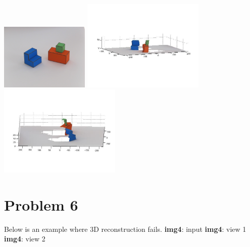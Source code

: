 \documentclass[12pt,twoside]{article}
\newcommand{\tabUnit}{3ex}
\newcommand{\tabT}{\hspace*{\tabUnit}}
\begin{document}
\includegraphics[width = 120pt]{img2}
\includegraphics[width = 165pt]{img2_cv1}
\includegraphics[width = 165pt]{img2_cv2}

\section*{Problem 6}
Below is an example where 3D reconstruction fails.
\newline
\newline
\tabT\tabT\tabT \textbf{img4}: input
\tabT\tabT\tabT\tabT\tabT \textbf{img4}: view 1
\tabT\tabT\tabT\tabT\tabT \textbf{img4}: view 2 
\newline
\end{document}
